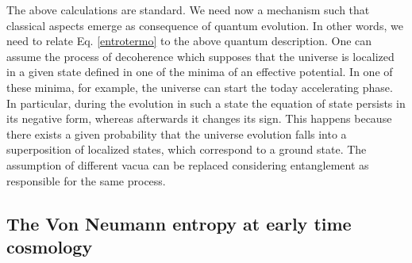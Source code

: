 \documentclass[nofootinbib,prd,superscriptaddress,showpacs,showkeys,]{revtex4}
\begin{document}
The above calculations are standard. We need now a mechanism such that classical aspects emerge as consequence of quantum evolution. In other words, we need to relate Eq. \eqref{entrotermo} to the above quantum description. One can assume the  process of decoherence which supposes that the universe is localized in a given  state  defined in one of the minima of an effective potential. In one of these minima, for example, the universe can start the today accelerating phase. In particular, during the evolution in such a state the  equation of state persists in its negative form, whereas afterwards it changes its sign. This happens because there exists a given probability that the universe evolution falls into a superposition of localized states, which correspond to a ground state. The assumption of different vacua can be replaced considering entanglement as responsible for the same process.


\subsection{The  Von Neumann entropy at early time cosmology}
\end{document}
